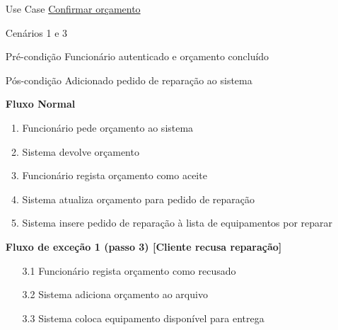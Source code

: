 \documentclass[../relatorio.tex]{subfiles}
\begin{document}
\begin{itemize}
    \item[Use Case] {\underline{Confirmar orçamento}}
    \item[Cenários] {1 e 3}
    \item[Pré-condição] {Funcionário autenticado e orçamento concluído}
    \item[Pós-condição] {Adicionado pedido de reparação ao sistema}
          \begin{flushleft}
              \textbf{Fluxo Normal}
          \end{flushleft}
          \begin{enumerate}
              \item Funcionário pede orçamento ao sistema
              \item Sistema devolve orçamento
              \item Funcionário regista orçamento como aceite
              \item Sistema atualiza orçamento para pedido de reparação
              \item Sistema insere pedido de reparação à lista de equipamentos por reparar
          \end{enumerate}
          \begin{flushleft}
              \textbf{Fluxo de exceção 1 (passo 3) [Cliente recusa reparação]}
          \end{flushleft}
          \begin{itemize}
              \item[3.1]{Funcionário regista orçamento como recusado}
              \item[3.2]{Sistema adiciona orçamento ao arquivo}
              \item[3.3]{Sistema coloca equipamento disponível para entrega}
          \end{itemize}
\end{itemize}
\end{document}
